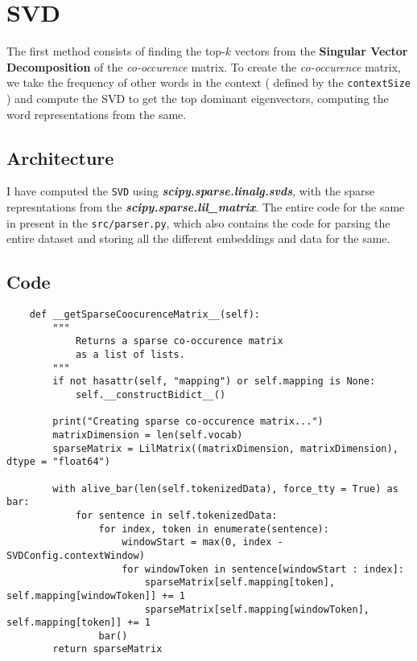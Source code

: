 \section*{SVD}
\label{sec:svd}

The first method consists of finding the top-$k$ vectors from the \textbf{Singular Vector Decomposition} of the \textit{co-occurence} matrix. To create the \textit{co-occurence} matrix, we take the frequency of other words in the context ( defined by the \verb|contextSize| ) and compute the SVD to get the top dominant eigenvectors, 
computing the word representations from the same.

\subsection*{Architecture}
I have computed the \verb|SVD| using \textbf{\textit{scipy.sparse.linalg.svds}}, with the sparse represntations from the \textbf{\textit{scipy.sparse.lil\_matrix}}. The entire code for the same in present in the \verb|src/parser.py|, which also contains the code for parsing the entire dataset and storing all the different embeddings and data for the same.

\subsection*{Code}

\begin{lstlisting}
    def __getSparseCoocurenceMatrix__(self):
        """
            Returns a sparse co-occurence matrix
            as a list of lists.
        """
        if not hasattr(self, "mapping") or self.mapping is None:
            self.__constructBidict__()
        
        print("Creating sparse co-occurence matrix...")
        matrixDimension = len(self.vocab)
        sparseMatrix = LilMatrix((matrixDimension, matrixDimension), dtype = "float64")
        
        with alive_bar(len(self.tokenizedData), force_tty = True) as bar:
            for sentence in self.tokenizedData:
                for index, token in enumerate(sentence):
                    windowStart = max(0, index - SVDConfig.contextWindow)
                    for windowToken in sentence[windowStart : index]:
                        sparseMatrix[self.mapping[token], self.mapping[windowToken]] += 1
                        sparseMatrix[self.mapping[windowToken], self.mapping[token]] += 1
                bar()
        return sparseMatrix
\end{lstlisting}

